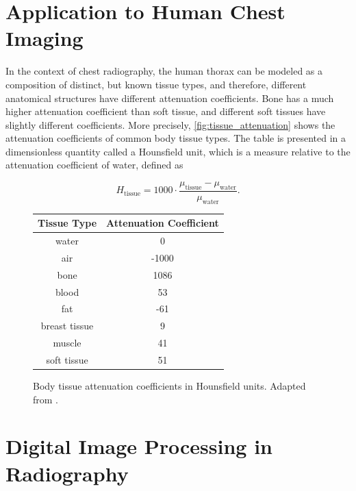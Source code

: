 \documentclass[nomenclature, english, bibtex]{kththesis}
\numberwithin{listing}{chapter}
\begin{document}
\section{Application to Human Chest Imaging}
\label{sec:human_chest_imaging}

In the context of chest radiography, the human thorax can be modeled as a composition of distinct, but
known tissue types, and therefore, different anatomical structures have different attenuation coefficients.
Bone has a much higher attenuation coefficient than soft tissue, and different soft tissues have slightly
different coefficients. More precisely, \autoref{fig:tissue_attenuation} shows the attenuation coefficients
of common body tissue types. The table is presented in a dimensionless quantity called a
Hounsfield unit, which is a measure relative to the attenuation coefficient of water, defined as
\cite[p.~54]{epstein2008}

\begin{equation}
    H_{\text{tissue}} = 1000 \cdot \frac{\mu_{\text{tissue}} − \mu_{\text{water}}}{\mu_{\text{water}}}.
\end{equation}

\begin{figure}[H]
    \centering
    \begin{tabular}{|c|c|}
        \hline
        Tissue Type & Attenuation Coefficient \\
        \hline
        water & 0 \\
        \hline
        air & -1000 \\
        \hline
        bone & 1086 \\
        \hline
        blood & 53 \\
        \hline
        fat & -61 \\
        \hline
        breast tissue & 9 \\
        \hline
        muscle & 41 \\
        \hline
        soft tissue & 51 \\
        \hline
    \end{tabular}
    \caption{Body tissue attenuation coefficients in Hounsfield units. Adapted from \cite[p.~54]{epstein2008}.}
    \label{fig:tissue_attenuation}
\end{figure}


\section{Digital Image Processing in Radiography}
\label{sec:DigitalImageProcessing}
\end{document}
